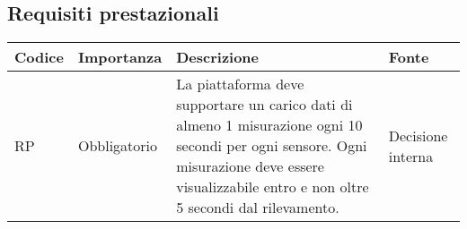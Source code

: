 \subsection{Requisiti prestazionali}
\setcounter{rowcounter}{0}
\begin{longtable}{|C{1.5cm}|C{2cm}|L{5cm}|C{2cm}|}
    \hline
    \textbf{Codice} & \textbf{Importanza} & \textbf{Descrizione} & \textbf{Fonte}  \\

    \hline
     RP & Obbligatorio & La piattaforma deve supportare un carico dati di almeno 1 misurazione ogni 10 secondi per ogni sensore. Ogni misurazione deve essere visualizzabile entro e non oltre 5 secondi dal rilevamento. & Decisione interna \\
   
    \hline
\end{longtable}
